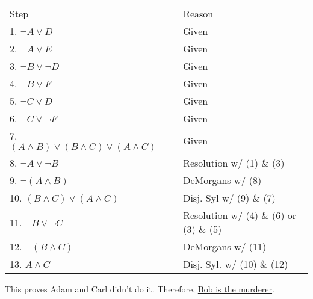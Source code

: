 \documentclass[12pt,addpoints]{exam}
\begin{document}
\begin{questions}
\begin{solution}
\begin{tabular}{lll}
    Step                    & \hspace{0.15in} & Reason \\
    1. $\neg A \vee D$				& & Given \\
    2. $\neg A \vee E$				& & Given \\
    3. $\neg B \vee \neg D$			& & Given \\
    4. $\neg B \vee F$				& & Given \\
    5. $\neg C \vee D$				& & Given \\
    6. $\neg C \vee \neg F$			& & Given \\
    7. $(A \wedge B) \vee (B \wedge C) \vee (A \wedge C)$	& & Given \\
    8. $\neg A \vee \neg B$			& & Resolution w/ (1) \& (3) \\
    9. $\neg (A \wedge B)$			& & DeMorgans w/ (8) \\
    10. $(B \wedge C) \vee (A \wedge C)$	& & Disj. Syl w/ (9) \& (7) \\
    11. $\neg B \vee \neg C$		& & Resolution w/ (4) \& (6)  or (3) \& (5) \\
    12. $\neg (B \wedge C)$			& & DeMorgans w/ (11) \\
    13. $A \wedge C$				& & Disj. Syl. w/ (10) \& (12)
\end{tabular}

This proves Adam and Carl didn't do it. 
Therefore, \underline{Bob is the murderer}.        

\end{solution}




\end{questions}
\end{document}
